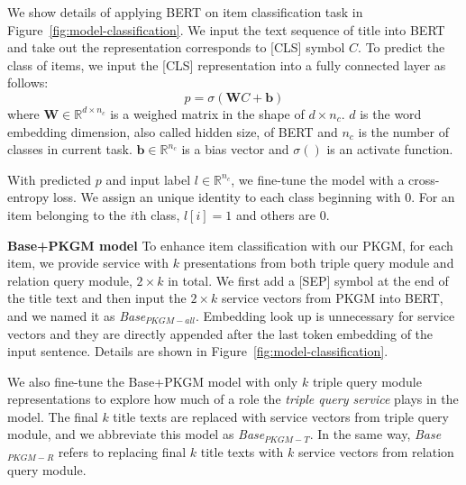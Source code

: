 \begin{figure*}[!htbp]
     \centering
    \caption{Models for item classification.}
    \label{fig:model-classification}
\end{figure*}

We show details of applying BERT on item classification task in Figure~\ref{fig:model-classification}. We input the text sequence of title into BERT and take out the representation corresponds to [CLS] symbol $C$. To predict the class of items, we input the [CLS] representation into a fully connected layer as follows:
\begin{equation}
    p = \sigma(\mathbf{W}C + \mathbf{b})
\end{equation}
where $\mathbf{W} \in \mathbb{R}^{d \times n_c}$ is a weighed matrix in the shape of ${d \times n_c}$. $d$ is the word embedding dimension, also called hidden size, of BERT and $n_c$ is the number of classes in current task. $\mathbf{b}\in \mathbb{R}^{n_c}$ is a bias vector and $\sigma()$ is an activate function. 

With predicted $p$ and input label $l \in \mathbb{R} ^{n_c}$, we fine-tune the model with a cross-entropy loss. We assign an unique identity to each class beginning with $0$. For an item belonging to the $i$th class, $l[i] =1$ and others are $0$. 

\textbf{Base+PKGM model}
To enhance item classification with our PKGM, for each item, we provide service with $k$ presentations from both triple query module and relation query module, $2\times k$ in total. We first add a [SEP] symbol at the end of the title text and then input the $2\times k$ service vectors from PKGM into BERT, and we named it as \emph{Base$_{PKGM-all}$}. Embedding look up is unnecessary for service vectors and they are directly appended after the last token embedding of the input sentence.  Details are shown in Figure~\ref{fig:model-classification}.

We also fine-tune the Base+PKGM model with only $k$ triple query module representations to explore how much of a role the \textit{triple query service} plays in the model. The final $k$ title texts are replaced with service vectors from triple query module, and we abbreviate this model as \emph{Base$_{PKGM-T}$}. In the same way, \emph{Base$_{PKGM-R}$} refers to replacing final $k$ title texts with $k$ service vectors from relation query module.

